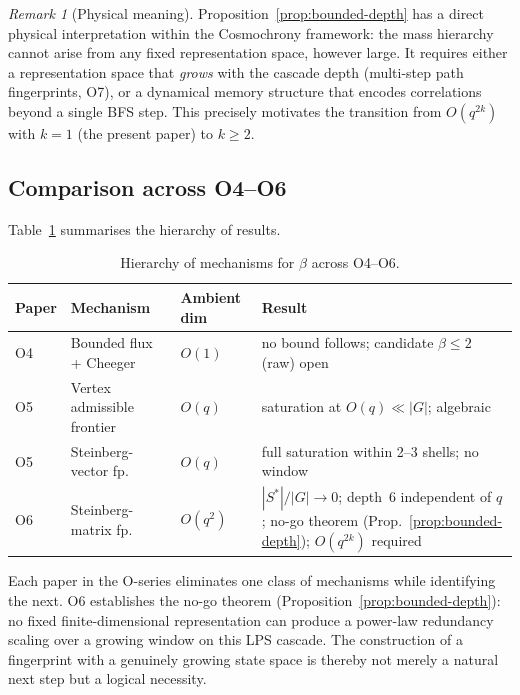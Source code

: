 \documentclass[11pt]{article}
\theoremstyle{definition}
\theoremstyle{remark}
\newtheorem{remark}[theorem]{Remark}
\begin{document}
    \begin{remark}[Physical meaning]
      \label{rem:physical-meaning}
      Proposition~\ref{prop:bounded-depth} has a direct physical interpretation within the
      Cosmochrony framework: the mass hierarchy cannot arise from any fixed representation
      space, however large.
      It requires either a representation space that \emph{grows} with the cascade depth
      (multi-step path fingerprints, O7), or a dynamical memory structure that encodes
      correlations beyond a single BFS step.
      This precisely motivates the transition from $O(q^{2k})$ with $k=1$ (the present
      paper) to $k \geq 2$.
    \end{remark}

  \subsection{Comparison across O4--O6}
    \label{ssec:comparison}

    Table~\ref{tab:comparison} summarises the hierarchy of results.

    \begin{table}[ht]
      \centering
      \caption{Hierarchy of mechanisms for $\beta$ across O4--O6.}
      \label{tab:comparison}
      \begin{tabular}{@{}lllp{5cm}@{}}
        \toprule
        Paper & Mechanism              & Ambient dim & Result                                  \\
        \midrule
        O4    & Bounded flux + Cheeger & $O(1)$      & no bound follows; candidate $\beta \leq 2$ (raw) open \\
        O5 & Vertex admissible frontier & $O(q)$ & saturation at $O(q) \ll |G|$;
        algebraic \\
        O5    & Steinberg-vector fp.   & $O(q)$      & full saturation within 2--3 shells; no window \\
        O6 & Steinberg-matrix fp. & $O(q^2)$ & $|S^*|/|G| \to 0$; depth~6 independent
        of $q$; no-go theorem (Prop.~\ref{prop:bounded-depth}); $O(q^{2k})$ required \\
        \bottomrule
      \end{tabular}
    \end{table}

    Each paper in the O-series eliminates one class of mechanisms while identifying the
    next.
    O6 establishes the no-go theorem (Proposition~\ref{prop:bounded-depth}): no fixed
    finite-dimensional representation can produce a power-law redundancy scaling over a growing window on
    this LPS cascade.
    The construction of a fingerprint with a genuinely growing state space is thereby
    not merely a natural next step but a logical necessity.
\end{document}
